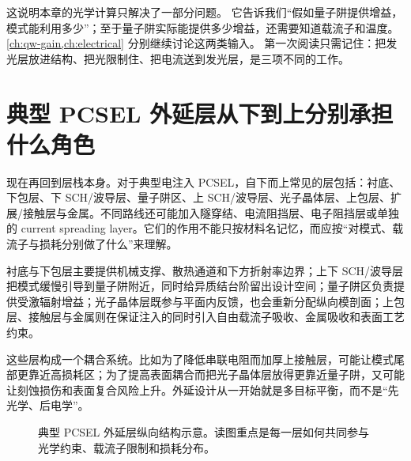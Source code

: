 这说明本章的光学计算只解决了一部分问题。
它告诉我们“假如量子阱提供增益，模式能利用多少”；至于量子阱实际能提供多少增益，还需要知道载流子和温度。
\cref{ch:qw-gain,ch:electrical} 分别继续讨论这两类输入。
第一次阅读只需记住：把发光层放进结构、把光限制住、把电流送到发光层，是三项不同的工作。

\section{典型 PCSEL 外延层从下到上分别承担什么角色}
现在再回到层栈本身。对于典型电注入 PCSEL，自下而上常见的层包括：衬底、下包层、下 SCH/波导层、量子阱区、上 SCH/波导层、光子晶体层、上包层、扩展/接触层与金属。不同路线还可能加入隧穿结、电流阻挡层、电子阻挡层或单独的 current spreading layer。它们的作用不能只按材料名记忆，而应按“对模式、载流子与损耗分别做了什么”来理解。

衬底与下包层主要提供机械支撑、散热通道和下方折射率边界；上下 SCH/波导层把模式缓慢引导到量子阱附近，同时给异质结台阶留出设计空间；量子阱区负责提供受激辐射增益；光子晶体层既参与平面内反馈，也会重新分配纵向模剖面；上包层、接触层与金属则在保证注入的同时引入自由载流子吸收、金属吸收和表面工艺约束。

这些层构成一个耦合系统。比如为了降低串联电阻而加厚上接触层，可能让模式尾部更靠近高损耗区；为了提高表面耦合而把光子晶体层放得更靠近量子阱，又可能让刻蚀损伤和表面复合风险上升。外延设计从一开始就是多目标平衡，而不是“先光学、后电学”。

\begin{figure}[htbp]
  \centering
  \caption{典型 PCSEL 外延层纵向结构示意。读图重点是每一层如何共同参与光学约束、载流子限制和损耗分布。}
  \label{fig:epi-stack}
\end{figure}

